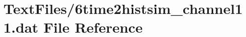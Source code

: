 \hypertarget{6time2histsim__channel11_8dat}{}\section{Text\+Files/6time2histsim\+\_\+channel11.dat File Reference}
\label{6time2histsim__channel11_8dat}
